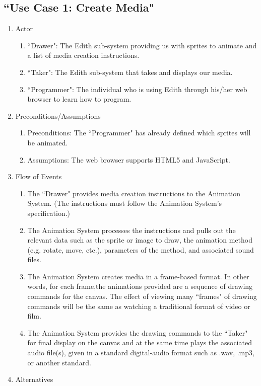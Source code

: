 \documentclass[12pt]{article}
\begin{document}
	\subsection{``Use Case 1: Create Media"}
\begin{enumerate}
  \item Actor
  \begin{enumerate}
  		\item ``Drawer": The Edith sub-system providing us with sprites to animate and a list of media creation instructions.
   		 \item ``Taker": The Edith sub-system that takes and displays our media.
       \item ``Programmer": The individual who is using Edith through his/her web browser to learn how to program.
  \end{enumerate}
  \item Preconditions/Assumptions
  \begin{enumerate}
   		 \item Preconditions: The ``Programmer" has already defined which sprites will be animated.
   		 \item Assumptions: The web browser supports HTML5 and JavaScript.
  \end{enumerate}
  \item Flow of Events
  \begin{enumerate}
   		 \item The ``Drawer" provides media creation instructions to the Animation System. (The instructions must follow the Animation System's specification.)
   		 \item The Animation System processes the instructions and pulls out the relevant data such as the sprite or image to draw, the animation method (e.g. rotate, move, etc.), parameters of the method, and associated sound files.
		\item The Animation System creates media in a frame-based format. In other words, for each frame,the animations provided are a sequence of drawing commands for the canvas. The effect of viewing many ``frames" of drawing commands will be the same as watching a traditional format of video or film.
		\item The Animation System provides the drawing commands to the ``Taker" for final display on the canvas and at the same time plays the associated audio file(s), given in a standard digital-audio format such as .wav, .mp3, or another standard.
  \end{enumerate}
  \item Alternatives

\end{enumerate}
\end{document}
